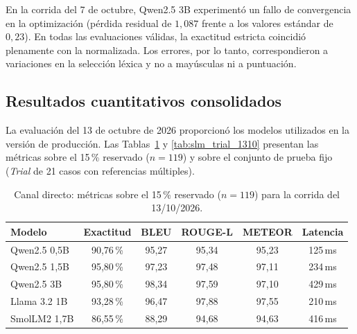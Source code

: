 En la corrida del 7 de octubre, Qwen2.5 3B experimentó un fallo de convergencia en la optimización (pérdida residual de $1{,}087$ frente a los valores estándar de $0{,}23$). En todas las evaluaciones válidas, la exactitud estricta coincidió plenamente con la normalizada. Los errores, por lo tanto, correspondieron a variaciones en la selección léxica y no a mayúsculas ni a puntuación.

\subsection{Resultados cuantitativos consolidados}
\label{sec:eval_semantica_cuant}
La evaluación del 13 de octubre de 2026 proporcionó los modelos utilizados en la versión de producción. Las Tablas~\ref{tab:slm_test_1310} y \ref{tab:slm_trial_1310} presentan las métricas sobre el 15\,\% reservado ($n=119$) y sobre el conjunto de prueba fijo (\textit{Trial} de 21 casos con referencias múltiples).

\begin{table}[H]
    \centering
    \small
    \caption{Canal directo: métricas sobre el 15\,\% reservado ($n=119$) para la corrida del 13/10/2026.}
    \label{tab:slm_test_1310}
    \begin{tabular}{lccccc}
        \toprule
        \textbf{Modelo} & \textbf{Exactitud} & \textbf{BLEU} & \textbf{ROUGE-L} & \textbf{METEOR} & \textbf{Latencia} \\
        \midrule
        Qwen2.5 0,5B & 90{,}76\,\% & 95{,}27 & 95{,}34 & 95{,}23 & 125\,ms \\
        Qwen2.5 1,5B & 95{,}80\,\% & 97{,}23 & 97{,}48 & 97{,}11 & 234\,ms \\
        Qwen2.5 3B & 95{,}80\,\% & 98{,}34 & 97{,}59 & 97{,}10 & 429\,ms \\
        Llama 3.2 1B & 93{,}28\,\% & 96{,}47 & 97{,}88 & 97{,}55 & 210\,ms \\
        SmolLM2 1,7B & 86{,}55\,\% & 88{,}29 & 94{,}68 & 94{,}63 & 416\,ms \\
        \bottomrule
    \end{tabular}
\end{table}

